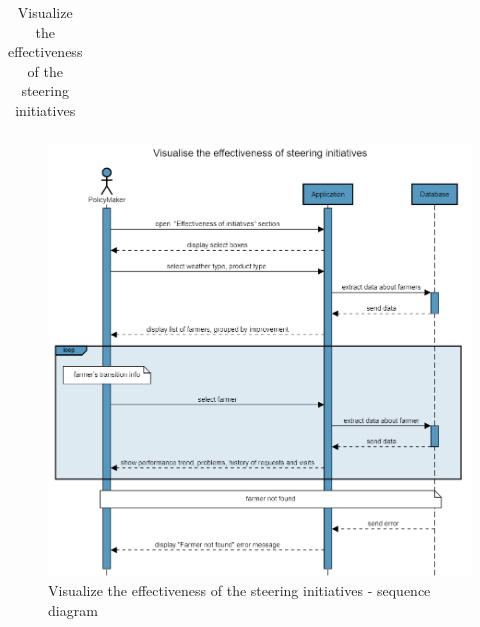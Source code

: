 \begin{table}[H]
\begin{tabular}{|l|p{}|}
    \end{tabular}
    \caption{\label{tab:visualize_improvement}Visualize the effectiveness of the steering initiatives}
\end{table}

\begin{figure}[H]
    \centering
    \includegraphics[scale=0.5]{Images/Sequence diagrams/SE2 - visualise effectiveness of steering initiatives (pm).png}
    \caption{Visualize the effectiveness of the steering initiatives - sequence diagram}
    \label{fig:seq_diag_visualize_improvement}
\end{figure}

